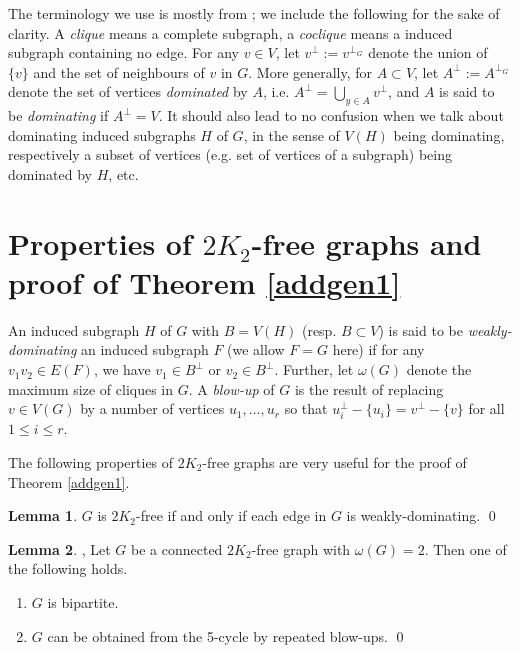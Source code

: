 \documentclass{amsart}
\theoremstyle{definition}
\newtheorem{lemma}{Lemma}
\newcommand{\ncc}{c}
\begin{document}
The terminology we use is  mostly from \cite{bomu08}; we include the following for the sake of
clarity.  
A {\em clique} means a complete subgraph, a {\em coclique} means a
induced subgraph containing no edge. 
For any
$v\in V$, let $v^\perp:=v^{\perp_G}$ denote the union of $\{v\}$ and the set of
neighbours of $v$ in $G$.  More generally, for $A\subset V$, let
$A^\perp:=A^{\perp_G}$ denote the set of vertices {\em dominated} by $A$, i.e.
$A^\perp=\bigcup\limits_{y\in A}v^\perp$, and $A$ is said to be {\em
dominating} if $A^\perp=V$.  It should also lead to no confusion when we talk
about  dominating induced subgraphs $H$ of $G$, in the sense of $V(H)$ being
dominating, respectively a subset of vertices (e.g. set of vertices of a
subgraph) being dominated by $H$, etc.

\section{Properties of $2K_2$-free graphs and proof of Theorem \ref{addgen1}}
An induced subgraph $H$ of $G$ with $B=V(H)$ (resp. $B\subset V$) is said to be {\em weakly-dominating}
an induced subgraph $F$ (we allow $F=G$ here) 
if for any $v_1v_2\in E(F)$, we have $v_1\in B^\perp$ or $v_2\in B^\perp$.
Further, let $\omega(G)$ denote the maximum size of cliques in $G$.
A {\em blow-up} of $G$ is the result of replacing $v\in V(G)$ 
by a number of vertices $u_1,\dots,u_r$ so that $u_i^\perp-\{u_i\}=v^\perp-\{v\}$
for all $1\leq i\leq r$.


The following properties of $2K_2$-free graphs are very useful for the proof of Theorem \ref{addgen1}.
\begin{lemma}\label{trivial}
$G$ is $2K_2$-free if and only if each edge in $G$ is weakly-dominating. \qed
\end{lemma}

\begin{lemma}\label{lm1}{\cite[Theorem 2]{chung1990maximum}, \cite[Lemma 2]{broersma2014toughness}}
Let $G$ be a connected $2K_2$-free graph with $\omega(G)=2$. Then one of the following holds. 
\begin{enumerate}
\item $G$ is bipartite.
\item $G$ can be obtained from the 5-cycle by repeated blow-ups. \qed
\end{enumerate}
\end{lemma}
\end{document}
